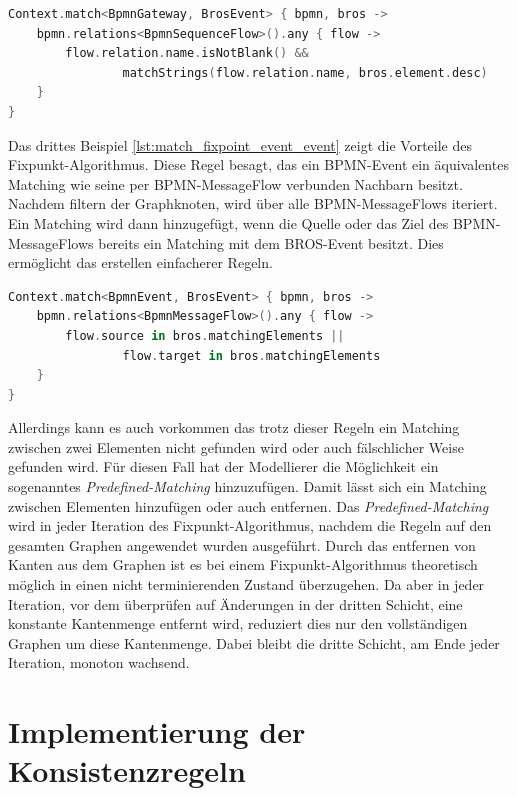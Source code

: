 \begin{lstlisting}[language=Kotlin, caption=Matching Regel von einem BPMN-Gateway und einem BROS-Event, label=lst:match_gateway_event]
Context.match<BpmnGateway, BrosEvent> { bpmn, bros ->
    bpmn.relations<BpmnSequenceFlow>().any { flow ->
        flow.relation.name.isNotBlank() &&
                matchStrings(flow.relation.name, bros.element.desc)
    }
}
\end{lstlisting}

Das drittes Beispiel \cref{lst:match_fixpoint_event_event} zeigt die Vorteile des Fixpunkt-Algorithmus.
Diese Regel besagt, das ein BPMN-Event ein äquivalentes Matching wie seine per BPMN-MessageFlow verbunden Nachbarn besitzt.
Nachdem filtern der Graphknoten, wird über alle BPMN-MessageFlows iteriert.
Ein Matching wird dann hinzugefügt, wenn die Quelle oder das Ziel des BPMN-MessageFlows bereits ein Matching mit dem BROS-Event besitzt.
Dies ermöglicht das erstellen einfacherer Regeln.

\begin{lstlisting}[language=Kotlin, caption=Fixpunkt Matching Regel von einem BPMN-BpmnEvent und einem BROS-Event, label=lst:match_fixpoint_event_event]
Context.match<BpmnEvent, BrosEvent> { bpmn, bros ->
    bpmn.relations<BpmnMessageFlow>().any { flow ->
        flow.source in bros.matchingElements ||
                flow.target in bros.matchingElements
    }
}
\end{lstlisting}

Allerdings kann es auch vorkommen das trotz dieser Regeln ein Matching zwischen zwei Elementen nicht gefunden wird oder auch fälschlicher Weise gefunden wird.
Für diesen Fall hat der Modellierer die Möglichkeit ein sogenanntes \emph{Predefined-Matching} hinzuzufügen.
Damit lässt sich ein Matching zwischen Elementen hinzufügen oder auch entfernen.
Das \emph{Predefined-Matching} wird in jeder Iteration des Fixpunkt-Algorithmus, nachdem die Regeln auf den gesamten Graphen angewendet wurden ausgeführt.
Durch das entfernen von Kanten aus dem Graphen ist es bei einem Fixpunkt-Algorithmus theoretisch möglich in einen nicht terminierenden Zustand überzugehen.
Da aber in jeder Iteration, vor dem überprüfen auf Änderungen in der dritten Schicht, eine konstante Kantenmenge entfernt wird, reduziert dies nur den vollständigen Graphen um diese Kantenmenge.
Dabei bleibt die dritte Schicht, am Ende jeder Iteration, monoton wachsend. 

\section{Implementierung der Konsistenzregeln}
\label{sec:implementaion_consistency_rules}

